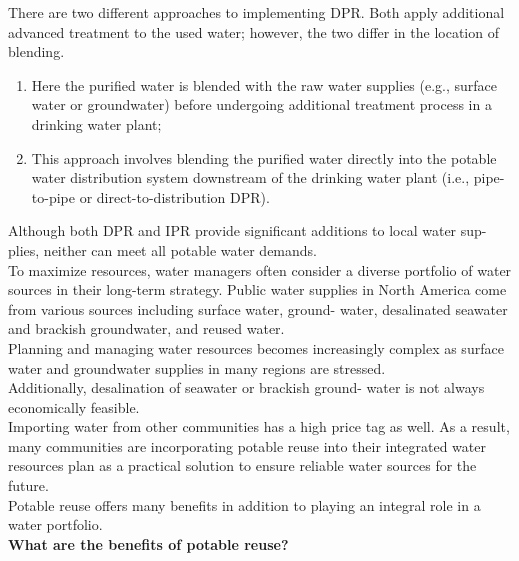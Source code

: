 \documentclass{article}
\begin{document}
There are two different approaches to implementing DPR. Both apply additional advanced treatment to the used water; however, the two differ in the location of blending. 
\begin{enumerate}
\item Here the purified water is blended with the raw water supplies (e.g., surface water or groundwater) before undergoing additional treatment process in a drinking water plant; 
\item This approach involves blending the purified water directly into the potable water distribution system downstream of the drinking water plant (i.e., pipe-to-pipe or direct-to-distribution DPR).
\end{enumerate}
Although both DPR and IPR provide significant additions to local water sup- plies, neither can meet all potable water demands.\\

To maximize resources, water managers often consider a diverse portfolio of water sources in their long-term strategy. Public water supplies in North America come from various sources including surface water, ground- water, desalinated seawater and brackish groundwater, and reused water. \\
Planning and managing water resources becomes increasingly complex as surface water and groundwater supplies in many regions are stressed. \\
Additionally, desalination of seawater or brackish ground- water is not always economically feasible.\\
Importing water from other communities has a high price tag as well. As a result, many communities are incorporating potable reuse into their integrated water resources plan as a practical solution to ensure reliable water sources for the future. \\
Potable reuse offers many benefits in addition to playing an integral role in a water portfolio.\\


\textbf{What are the benefits of potable reuse?}\\
\end{document}
